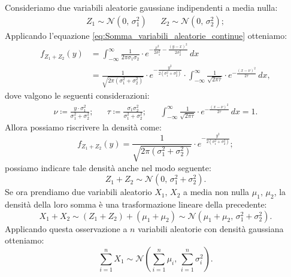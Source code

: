         \begin{obsv}
            Consideriamo due variabili aleatorie gaussiane indipendenti a media nulla:
            \begin{align*}
                Z_1 \sim \mathcal{N}(0,\, \sigma^2_1) & & Z_2 \sim \mathcal{N}(0,\, \sigma^2_2)
            ;\end{align*}
            Applicando l'equazione \eqref{eq:Somma_variabili_aleatorie_continue} otteniamo:
            \begin{align*}
                f_{Z_1+Z_2}(y) &= \int_{-\infty}^{\infty} \frac{1}{2\pi \sigma_1 \sigma_2} \cdot e^{-\frac{x^2}{2\sigma_1^2}-\frac{(y-x)^2}{2\sigma_2^2}}\, dx \\
                               &= \frac{1}{\sqrt{2\pi(\sigma_1^2 + \sigma_2^2)}} \cdot e^{-\frac{y^2}{2(\sigma_1^2 + \sigma_2^2)}} \cdot \int_{-\infty}^{\infty} \frac{1}{\sqrt{2\pi \tau}}\cdot e^{-\frac{(x-\nu)^2}{2\tau}}\, dx
            ,\end{align*}
            dove valgono le seguenti considerazioni:
            \begin{align*}
                \nu \coloneqq \frac{y \cdot \sigma_1^2}{\sigma_1^2 + \sigma_2^2}; & &
                \tau \coloneqq \frac{\sigma_1^ \cdot \sigma_2^2}{\sigma_1^2 + \sigma_2^2}; & &
                \int_{-\infty}^{\infty} \frac{1}{\sqrt{2\pi \tau}}\cdot e^{-\frac{(x-\nu)^2}{2\tau}}\, dx = 1
            .\end{align*}
            Allora possiamo riscrivere la densità come: \[
                f_{Z_1+Z_2}(y) = \frac{1}{\sqrt{2\pi (\sigma_1^2 + \sigma_2^2)}} \cdot e^{-\frac{y^2}{2(\sigma_1^2 + \sigma_2^2)}}
            ;\] possiamo indicare tale densità anche nel modo seguente: \[
            Z_1 + Z_2 \sim \mathcal{N}(0,\, \sigma_1^2 + \sigma_2^2)
            .\] Se ora prendiamo due variabili aleatorio $X_1,\,X_2$ a media non nulla $\mu_1,\,\mu_2$, la densità della loro somma è una trasformazione lineare della precedente: \[
            X_1 + X_2 \sim (Z_1 + Z_2) + (\mu_1 + \mu_2) \sim \mathcal{N}(\mu_1 + \mu_2,\, \sigma_1^2 + \sigma_2^2)
            .\] Applicando questa osservazione a $n$ variabili aleatorie con densità gaussiana otteniamo:
            \begin{equation*}
                \sum_{i=1}^{n} X_1 \sim \mathcal{N}\left(\sum_{i=1}^{n} \mu_i,\, \sum_{i=1}^{n} \sigma_i^2\right)
            .\end{equation*}
        \end{obsv}
